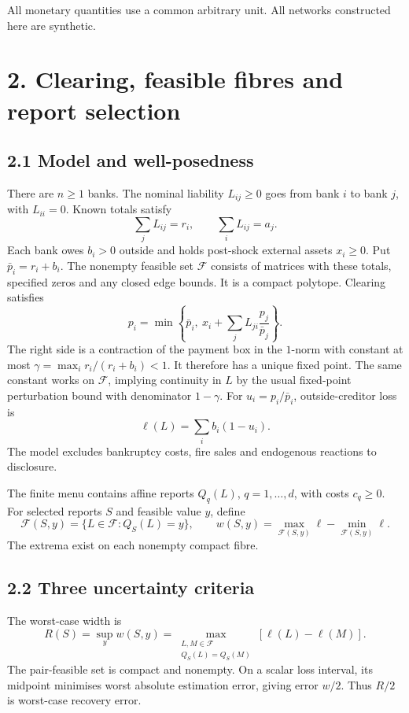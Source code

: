\documentclass[
  british,
  11pt,
  a4paper,
]{article}
\newcounter{none} %
\begin{document}
All monetary quantities use a common arbitrary unit. All networks
constructed here are synthetic.

\section{2. Clearing, feasible fibres and report
selection}\label{clearing-feasible-fibres-and-report-selection}

\subsection{2.1 Model and
well-posedness}\label{model-and-well-posedness}

There are \(n\ge1\) banks. The nominal liability \(L_{ij}\ge0\) goes
from bank \(i\) to bank \(j\), with \(L_{ii}=0\). Known totals satisfy
\[
\sum_jL_{ij}=r_i,\qquad\sum_iL_{ij}=a_j.
\] Each bank owes \(b_i>0\) outside and holds post-shock external assets
\(x_i\ge0\). Put \(\bar p_i=r_i+b_i\). The nonempty feasible set
\(\mathcal F\) consists of matrices with these totals, specified zeros
and any closed edge bounds. It is a compact polytope. Clearing satisfies
\[
p_i=\min\left\{\bar p_i,\ x_i+\sum_jL_{ji}\frac{p_j}{\bar p_j}\right\}.
\tag{1}
\] The right side is a contraction of the payment box in the \(1\)-norm
with constant at most \(\gamma=\max_i r_i/(r_i+b_i)<1\). It therefore
has a unique fixed point. The same constant works on \(\mathcal F\),
implying continuity in \(L\) by the usual fixed-point perturbation bound
with denominator \(1-\gamma\). For \(u_i=p_i/\bar p_i\),
outside-creditor loss is \[
\ell(L)=\sum_i b_i(1-u_i).
\tag{2}
\] The model excludes bankruptcy costs, fire sales and endogenous
reactions to disclosure.

The finite menu contains affine reports \(Q_q(L)\), \(q=1,\ldots,d\),
with costs \(c_q\ge0\). For selected reports \(S\) and feasible value
\(y\), define \[
\mathcal F(S,y)=\{L\in\mathcal F:Q_S(L)=y\},\qquad
w(S,y)=\max_{\mathcal F(S,y)}\ell-\min_{\mathcal F(S,y)}\ell .
\] The extrema exist on each nonempty compact fibre.

\subsection{2.2 Three uncertainty
criteria}\label{three-uncertainty-criteria}

The worst-case width is \[
R(S)=\sup_y w(S,y)
=\max_{\substack{L,M\in\mathcal F\\Q_S(L)=Q_S(M)}}[\ell(L)-\ell(M)].
\tag{3}
\] The pair-feasible set is compact and nonempty. On a scalar loss
interval, its midpoint minimises worst absolute estimation error, giving
error \(w/2\). Thus \(R/2\) is worst-case recovery error.
\end{document}
